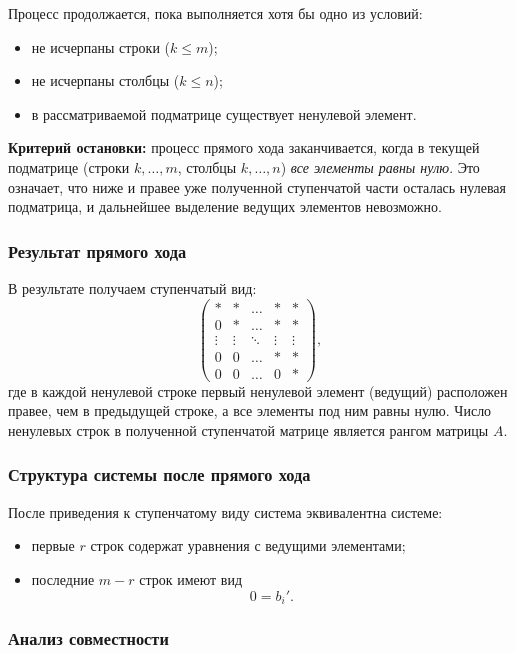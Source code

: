 \documentclass[10pt]{article}
\begin{document}
Процесс продолжается, пока выполняется хотя бы одно из условий:
\begin{itemize}
    \item не исчерпаны строки (\(k \le m\));
    \item не исчерпаны столбцы (\(k \le n\));
    \item в рассматриваемой подматрице существует ненулевой элемент.
\end{itemize}

\textbf{Критерий остановки:} процесс прямого хода заканчивается, когда в текущей подматрице (строки \(k, \dots, m\), столбцы \(k, \dots, n\)) \emph{все элементы равны нулю}. Это означает, что ниже и правее уже полученной ступенчатой части осталась нулевая подматрица, и дальнейшее выделение ведущих элементов невозможно.

\subsubsection*{Результат прямого хода}

В результате получаем ступенчатый вид:
\[
\begin{pmatrix}
* & * & \dots & * & * \\
0 & * & \dots & * & * \\
\vdots & \vdots & \ddots & \vdots & \vdots \\
0 & 0 & \dots & * & * \\
0 & 0 & \dots & 0 & *
\end{pmatrix},
\]
где в каждой ненулевой строке первый ненулевой элемент (ведущий) расположен правее, чем в предыдущей строке, а все элементы под ним равны нулю. Число ненулевых строк в полученной ступенчатой матрице является рангом матрицы $A$.

\subsubsection*{Структура системы после прямого хода}

После приведения к ступенчатому виду система эквивалентна системе:
\begin{itemize}
    \item первые \(r\) строк содержат уравнения с ведущими элементами;
    \item последние \(m - r\) строк имеют вид
    \[
    0 = b_i'.
    \]
\end{itemize}

\subsubsection*{Анализ совместности}
\end{document}
